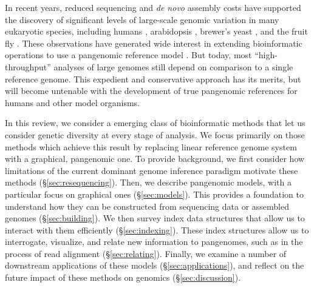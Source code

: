
In recent years, reduced sequencing and \emph{de novo} assembly costs have supported the discovery of significant levels of large-scale genomic variation in many eukaryotic species, including humans \cite{sudmant2015integrated,Hehir-Kwa2016-hb,chaisson2018multi,Audano_2019}, arabidopsis \cite{alonso2016arabidopsis}, brewer's yeast \cite{yue2017contrasting}, and the fruit fly \cite{chakraborty2018hidden}. %
These observations have generated wide interest in extending bioinformatic operations to use a pangenomic reference model \cite{computational2016computational}.
But today, most ``high-throughput'' analyses of large genomes still depend on comparison to a single reference genome.
This expedient and conservative approach has its merits, but will become untenable with the development of true pangenomic references for humans \cite{Church2015-vt} and other model organisms.

In this review, we consider a emerging class of bioinformatic methods that let us consider genetic diversity at every stage of analysis.
We focus primarily on those methods which achieve this result by replacing linear reference genome system with a graphical, pangenomic one.
To provide background, we first consider how limitations of the current dominant genome inference paradigm motivate these methods (\S \ref{sec:resequencing}).
Then, we describe pangenomic models, with a particular focus on graphical ones (\S \ref{sec:models}).
This provides a foundation to understand how they can be constructed from sequencing data or assembled genomes (\S \ref{sec:building}).
We then survey index data structures that allow us to interact with them efficiently (\S \ref{sec:indexing}).
These index structures allow us to interrogate, visualize, and relate new information to pangenomes, such as in the process of read alignment (\S \ref{sec:relating}).
Finally, we examine a number of downstream applications of these models (\S \ref{sec:applications}), and reflect on the future impact of these methods on genomics (\S \ref{sec:discussion}).

